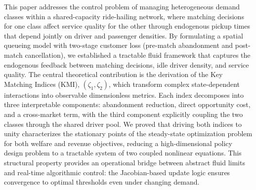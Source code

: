 This paper addresses the control problem of managing heterogeneous demand classes within a shared-capacity ride-hailing network, where matching decisions for one class affect service quality for the other through endogenous pickup times that depend jointly on driver and passenger densities.
By formulating a spatial queueing model with two-stage customer loss (pre-match abandonment and post-match cancellation), we established a tractable fluid framework that captures the endogenous feedback between matching decisions, idle driver density, and service quality.
The central theoretical contribution is the derivation of the Key Matching Indices (KMI), $(\zeta_1, \zeta_2)$, which transform complex state-dependent interactions into observable dimensionless metrics.
Each index decomposes into three interpretable components: abandonment reduction, direct opportunity cost, and a cross-market term, with the third component explicitly coupling the two classes through the shared driver pool.
We proved that driving both indices to unity characterizes the stationary points of the steady-state optimization problem for both welfare and revenue objectives, reducing a high-dimensional policy design problem to a tractable system of two coupled nonlinear equations.
This structural property provides an operational bridge between abstract fluid limits and real-time algorithmic control: the Jacobian-based update logic ensures convergence to optimal thresholds even under changing demand.

%

